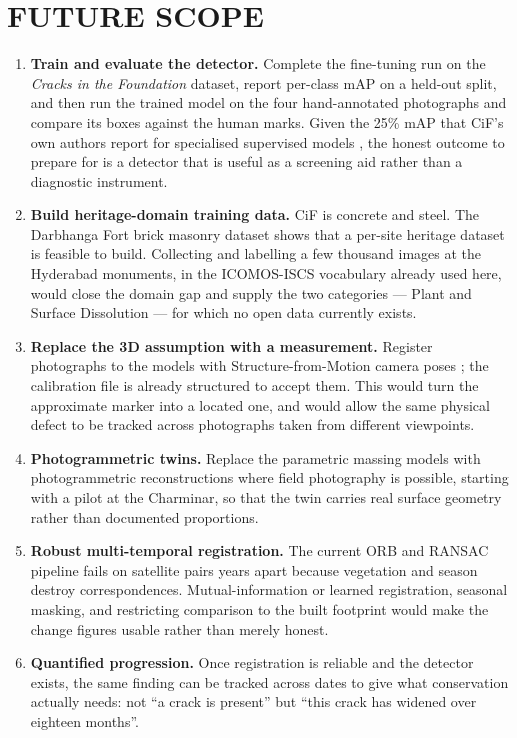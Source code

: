 \documentclass[a4paper,12pt,oneside]{book}
\begin{document}
\chapter{FUTURE SCOPE}

\begin{enumerate}
    \item \textbf{Train and evaluate the detector.} Complete the fine-tuning run on the \textit{Cracks in the Foundation} dataset, report per-class mAP on a held-out split, and then run the trained model on the four hand-annotated photographs and compare its boxes against the human marks. Given the 25\% mAP that CiF's own authors report for specialised supervised models \cite{farronato2026cif}, the honest outcome to prepare for is a detector that is useful as a screening aid rather than a diagnostic instrument.
    \item \textbf{Build heritage-domain training data.} CiF is concrete and steel. The Darbhanga Fort brick masonry dataset \cite{darbhanga2025dataset} shows that a per-site heritage dataset is feasible to build. Collecting and labelling a few thousand images at the Hyderabad monuments, in the ICOMOS-ISCS vocabulary already used here, would close the domain gap and supply the two categories --- Plant and Surface Dissolution --- for which no open data currently exists.
    \item \textbf{Replace the 3D assumption with a measurement.} Register photographs to the models with Structure-from-Motion camera poses \cite{schoenberger2016sfm}; the calibration file is already structured to accept them. This would turn the approximate marker into a located one, and would allow the same physical defect to be tracked across photographs taken from different viewpoints.
    \item \textbf{Photogrammetric twins.} Replace the parametric massing models with photogrammetric reconstructions where field photography is possible, starting with a pilot at the Charminar, so that the twin carries real surface geometry rather than documented proportions.
    \item \textbf{Robust multi-temporal registration.} The current ORB and RANSAC pipeline fails on satellite pairs years apart because vegetation and season destroy correspondences. Mutual-information or learned registration, seasonal masking, and restricting comparison to the built footprint would make the change figures usable rather than merely honest.
    \item \textbf{Quantified progression.} Once registration is reliable and the detector exists, the same finding can be tracked across dates to give what conservation actually needs: not ``a crack is present'' but ``this crack has widened over eighteen months''.

\end{enumerate}
\end{document}
